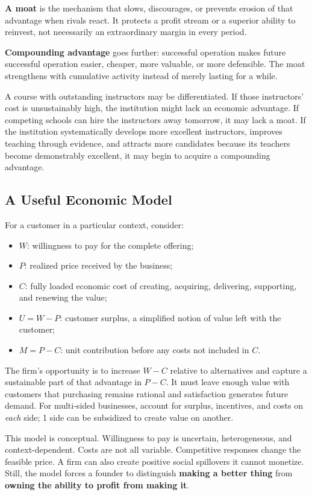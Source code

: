 \textbf{A moat} is the mechanism that slows, discourages, or prevents erosion of that advantage when rivals react. It protects a profit stream or a superior ability to reinvest, not necessarily an extraordinary margin in every period.

\textbf{Compounding advantage} goes further: successful operation makes future successful operation easier, cheaper, more valuable, or more defensible. The moat strengthens with cumulative activity instead of merely lasting for a while.

A course with outstanding instructors may be differentiated. If those instructors' cost is unsustainably high, the institution might lack an economic advantage. If competing schools can hire the instructors away tomorrow, it may lack a moat. If the institution systematically develops more excellent instructors, improves teaching through evidence, and attracts more candidates because its teachers become demonstrably excellent, it may begin to acquire a compounding advantage.

\subsection{A Useful Economic Model}
\label{sec:useful_economic_model}

For a customer in a particular context, consider:
\begin{itemize}
    \item $W$: willingness to pay for the complete offering;
    \item $P$: realized price received by the business;
    \item $C$: fully loaded economic cost of creating, acquiring, delivering, supporting, and renewing the value;
    \item $U = W - P$: customer surplus, a simplified notion of value left with the customer;
    \item $M = P - C$: unit contribution before any costs not included in $C$.
\end{itemize}

The firm's opportunity is to increase $W - C$ relative to alternatives and capture a sustainable part of that advantage in $P - C$. It must leave enough value with customers that purchasing remains rational and satisfaction generates future demand. For multi-sided businesses, account for surplus, incentives, and costs on \textit{each} side; 1 side can be subsidized to create value on another.

This model is conceptual. Willingness to pay is uncertain, heterogeneous, and context-dependent. Costs are not all variable. Competitive responses change the feasible price. A firm can also create positive social spillovers it cannot monetize. Still, the model forces a founder to distinguish \textbf{making a better thing} from \textbf{owning the ability to profit from making it}.

